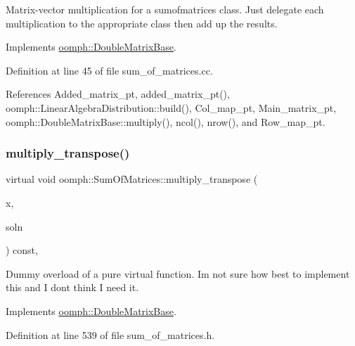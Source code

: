 Matrix-\/vector multiplication for a sumofmatrices class. Just delegate each multiplication to the appropriate class then add up the results. 

Implements \hyperlink{classoomph_1_1DoubleMatrixBase_a78204eab557e0dc99618e41a28a5c092}{oomph\+::\+Double\+Matrix\+Base}.



Definition at line 45 of file sum\+\_\+of\+\_\+matrices.\+cc.



References Added\+\_\+matrix\+\_\+pt, added\+\_\+matrix\+\_\+pt(), oomph\+::\+Linear\+Algebra\+Distribution\+::build(), Col\+\_\+map\+\_\+pt, Main\+\_\+matrix\+\_\+pt, oomph\+::\+Double\+Matrix\+Base\+::multiply(), ncol(), nrow(), and Row\+\_\+map\+\_\+pt.

\mbox{\label{classoomph_1_1SumOfMatrices_a0028fb64f602aa07ff557b0a11a1c659}} 
\subsubsection{\texorpdfstring{multiply\+\_\+transpose()}{multiply\_transpose()}}
{\footnotesize\ttfamily virtual void oomph\+::\+Sum\+Of\+Matrices\+::multiply\+\_\+transpose (\begin{DoxyParamCaption}\item[{const \hyperlink{classoomph_1_1DoubleVector}{Double\+Vector} \&}]{x,  }\item[{\hyperlink{classoomph_1_1DoubleVector}{Double\+Vector} \&}]{soln }\end{DoxyParamCaption}) const\hspace{0.3cm}{\ttfamily [inline]}, {\ttfamily [virtual]}}



Dummy overload of a pure virtual function. I\textquotesingle{}m not sure how best to implement this and I don\textquotesingle{}t think I need it. 



Implements \hyperlink{classoomph_1_1DoubleMatrixBase_a843d44405b70da1d96b43218a21e6ffc}{oomph\+::\+Double\+Matrix\+Base}.



Definition at line 539 of file sum\+\_\+of\+\_\+matrices.\+h.

